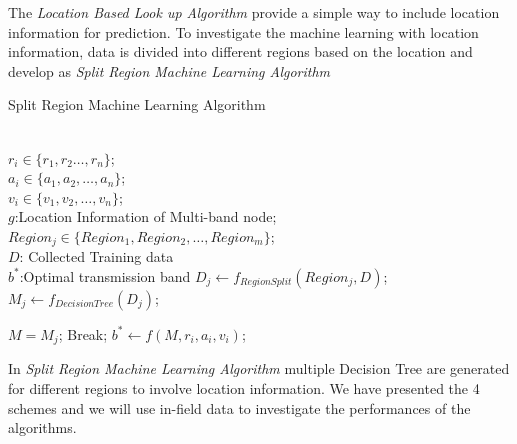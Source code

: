 The \emph{Location Based Look up Algorithm} provide a simple way to include location information for prediction. To investigate the machine learning with location information, data is divided into different regions based on the location and develop as \emph{Split Region Machine Learning Algorithm}


	  \begin{algorithm}
	  \caption{Split Region Machine Learning Algorithm}
	  \label{algorithms: Split}
	  \begin{algorithmic}[1]
	  \REQUIRE  ~~\\
		  $r_i \in \{r_1,r_2 \dots,r_n\}$;\\
		  $a_i \in \{a_1,a_2, \dots, a_n\}$;\\
		  $v_i \in \{v_1,v_2,\dots,v_n\}$;\\
		  $g$:Location Information of Multi-band node;\\
		  $Region_j \in \{Region_1, Region_2,\dots,Region_m\}$;\\
		  $D$: Collected Training data
\ENSURE ~~\\    
		  $b^*$:Optimal transmission band
\STATE $D_{j} \leftarrow f_{Region Split}(Region_j,D)$;
\STATE $M_{j} \leftarrow f_{Decision Tree}(D_{j})$;
\ENDFOR

\STATE $M=M_{j}$;
\STATE Break;
\ENDIF
\ENDFOR
\STATE $b^* \leftarrow f(M,r_i,a_i,v_i)$;
\ENDFOR \\
\end{algorithmic}
\end{algorithm}


In \emph{Split Region Machine Learning Algorithm} multiple Decision Tree are generated for different regions to involve location information. We have presented the 4 schemes and we will use in-field data to investigate the performances of the algorithms.







